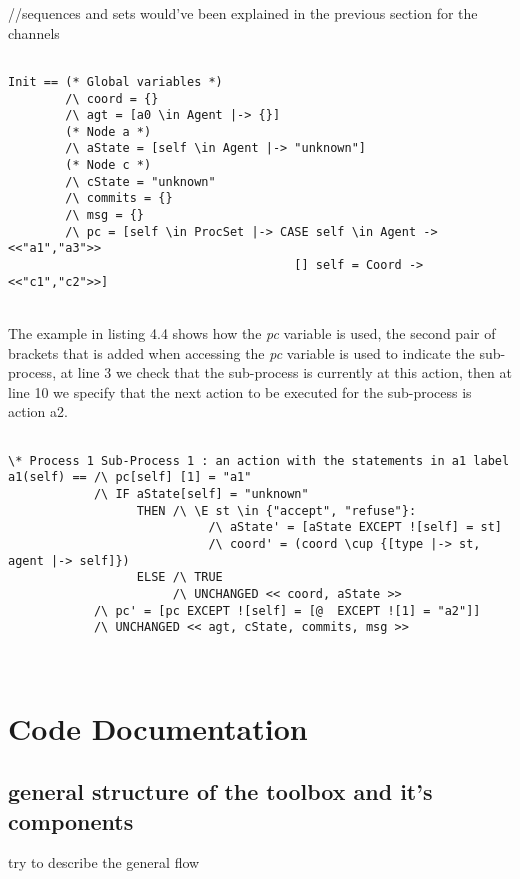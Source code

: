 \documentclass{thesul}
\begin{document}
\begin{itemize}
//sequences and sets would've been explained in the previous section for the channels

\begin{lstlisting}[caption = TLA+ translation for Sub-Processes, frame = tlrb, firstnumber = 1]

Init == (* Global variables *)
        /\ coord = {}
        /\ agt = [a0 \in Agent |-> {}]
        (* Node a *)
        /\ aState = [self \in Agent |-> "unknown"]
        (* Node c *)
        /\ cState = "unknown"
        /\ commits = {}
        /\ msg = {}
        /\ pc = [self \in ProcSet |-> CASE self \in Agent -> <<"a1","a3">>
                                        [] self = Coord -> <<"c1","c2">>]
\end{lstlisting}

\hfill\\
The example in listing 4.4 shows how the \textit{pc} variable is used, the second pair of brackets that is added when accessing the \textit{pc} variable is used to indicate the sub-process, at line 3 we check that the sub-process is currently at this action, then at line 10 we specify that the next action to be executed for the sub-process is action a2.

\begin{lstlisting}[caption = TLA+ translation for Sub-Processes, frame = tlrb, firstnumber = 1]

\* Process 1 Sub-Process 1 : an action with the statements in a1 label
a1(self) == /\ pc[self] [1] = "a1"
            /\ IF aState[self] = "unknown"
                  THEN /\ \E st \in {"accept", "refuse"}:
                            /\ aState' = [aState EXCEPT ![self] = st]
                            /\ coord' = (coord \cup {[type |-> st, agent |-> self]})
                  ELSE /\ TRUE
                       /\ UNCHANGED << coord, aState >>
            /\ pc' = [pc EXCEPT ![self] = [@  EXCEPT ![1] = "a2"]]
            /\ UNCHANGED << agt, cState, commits, msg >>

\end{lstlisting}

\end{itemize}

\hfill\\

\chapter{Code Documentation}

\section{general structure of the toolbox and it's components}
try to describe the general flow
\end{document}
